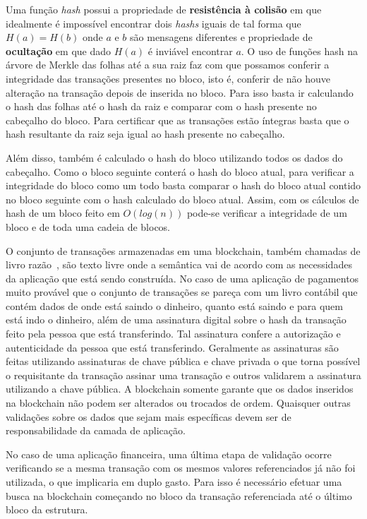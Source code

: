 \documentclass[12pt]{article}
\begin{document}
Uma função \emph{hash} possui a propriedade de \textbf{resistência à colisão} em que idealmente é impossível encontrar dois \emph{hashs} iguais de tal forma que $H(a) = H(b)$ onde $a$ e $b$ são mensagens diferentes e propriedade de \textbf{ocultação} em que dado $H(a)$ é inviável encontrar $a$. O uso de funções hash na árvore de Merkle das folhas até a sua raiz faz com que possamos conferir a integridade das transações presentes no bloco, isto é, conferir de não houve alteração na transação depois de inserida no bloco. Para isso basta ir calculando o hash das folhas até o hash da raiz e comparar com o hash presente no cabeçalho do bloco. Para certificar que as transações estão íntegras basta que o hash resultante da raiz seja igual ao hash presente no cabeçalho.

Além disso, também é calculado o hash do bloco utilizando todos os dados do cabeçalho. Como o bloco seguinte conterá o hash do bloco atual, para verificar a integridade do bloco como um todo basta comparar o hash do bloco atual contido no bloco seguinte com o hash calculado do bloco atual. Assim, com os cálculos de hash de um bloco feito em $O(log(n))$ pode-se verificar a integridade de um bloco e de toda uma cadeia de blocos.

O conjunto de transações armazenadas em uma blockchain, também chamadas de livro razão~\cite{greve2018blockchain}, são texto livre onde a semântica vai de acordo com as necessidades da aplicação que está sendo construída. No caso de uma aplicação de pagamentos muito provável que o conjunto de transações se pareça com um livro contábil que contém dados de onde está saindo o dinheiro, quanto está saindo e para quem está indo o dinheiro, além de uma assinatura digital sobre o hash da transação feito pela pessoa que está transferindo. Tal assinatura confere a autorização e autenticidade da pessoa que está transferindo. Geralmente as assinaturas são feitas utilizando assinaturas de chave pública e chave privada o que torna possível o requisitante da transação assinar uma transação e outros validarem a assinatura utilizando a chave pública. A blockchain somente garante que os dados inseridos na blockchain não podem ser alterados ou trocados de ordem. Quaisquer outras validações sobre os dados que sejam mais específicas devem ser de responsabilidade da camada de aplicação. 

No caso de uma aplicação financeira, uma última etapa de validação ocorre verificando se a mesma transação com os mesmos valores referenciados já não foi utilizada, o que implicaria em duplo gasto. Para isso é necessário efetuar uma busca na blockchain começando no bloco da transação referenciada até o último bloco da estrutura.
\end{document}
